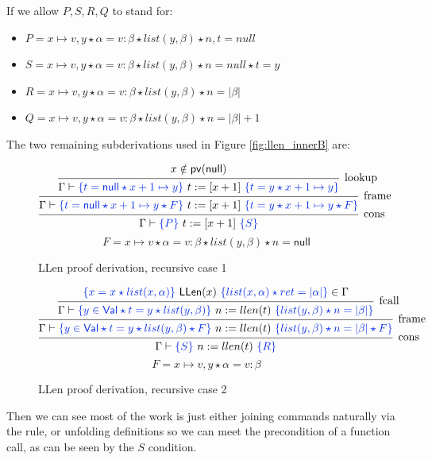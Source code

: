 \documentclass[11pt]{article}
\newcommand{\LLen}{\mathsf{LLen}}
\newcommand{\Val}{\mathsf{Val}}
\newcommand{\pv}{\mathsf{pv}}
\newcommand{\Null}{\mathsf{null}}
\begin{document}
If we allow $P,S,R,Q$ to stand for:

\begin{itemize}
	\item $P=x \mapsto v,y \star \alpha = v : \beta \star list(y,\beta) \star n,t=null$
	\item $S = x \mapsto v,y \star \alpha = v:\beta \star list(y,\beta) \star n=null \star t=y$
	\item $R = x \mapsto v, y \star \alpha = v : \beta \star list(y,\beta) \star n = | \beta |$
	\item $Q = x \mapsto v, y \star \alpha = v : \beta \star list(y,\beta) \star n = | \beta | + 1$
\end{itemize}

The two remaining subderivations used in Figure \ref{fig:llen_innerB} are:

\begin{figure}[H]
\small
\[
\begin{prooftree}
\hypo{x \notin \pv(\Null)}
\infer1[lookup]{\Gamma \entails \hoareT{t = \Null \star x + 1 \mapsto y}{t := [x+1]}{t = y \star x + 1 \mapsto y}}
\infer1[frame]{\Gamma \entails \hoareT{t = \Null \star x + 1 \mapsto y \star F}{t := [x+1]}{t = y \star x + 1 \mapsto y \star F}}
\infer1[cons]{\Gamma \entails \hoareT{P}{t := [x+1]}{S}}
\end{prooftree}
\]
\[
F = x \mapsto v \star \alpha = v:\beta \star list(y,\beta) \star n = \Null
\]
\caption{LLen proof derivation, recursive case 1}
\end{figure}

\begin{figure}[H]
\small
\[
\begin{prooftree}
\hypo{\hoareT{x = x \star list(x,\alpha)}{\LLen(x)}{list(x,\alpha) \star ret = |\alpha|} \in \Gamma}
\infer1[fcall]{\Gamma \entails \hoareT{y \in \Val \star t = y \star list(y,\beta)}{n := llen(t)}{list(y,\beta) \star n = |\beta|}}
\infer1[frame]{\Gamma \entails \hoareT{y \in \Val \star t = y \star list(y,\beta) \star F}{n := llen(t)}{list(y,\beta) \star n = |\beta| \star F}}
\infer1[cons]{\Gamma \entails \hoareT{S}{n := llen(t)}{R}}
\end{prooftree}
\]
\[
F = x \mapsto v,y \star \alpha = v:\beta
\]
\caption{LLen proof derivation, recursive case 2}
\end{figure}

Then we can see most of the work is just either joining commands naturally via the  rule, or unfolding definitions so we can meet the precondition of a function call, as can be seen by the $S$ condition.
\end{document}
